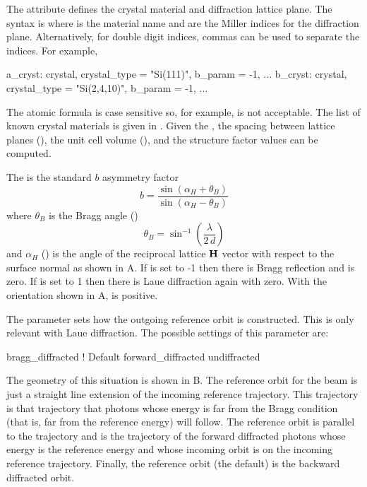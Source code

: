 The  attribute defines the crystal material and diffraction lattice plane. The
syntax is  where  is the material name and  are the Miller indices
for the diffraction plane. Alternatively, for double digit indices, commas can be used to separate
the indices. For example,
\begin{example}
  a_cryst: crystal, crystal_type = "Si(111)", b_param = -1, ...
  b_cryst: crystal, crystal_type = "Si(2,4,10)", b_param = -1, ...
\end{example}
The atomic formula is case sensitive so, for example,  is not acceptable. The list of
known crystal materials is given in . Given the , the spacing
between lattice planes (), the unit cell volume (), and the structure
factor\cite{b:batterman} values can be computed.

The  is the standard $b$ asymmetry factor
\begin{equation}
  b = \frac{\sin(\alpha_H + \theta_B)}{\sin(\alpha_H - \theta_B)} 
  \label{batat}
\end{equation}
where $\theta_B$ is the Bragg angle () 
\begin{equation}
  \theta_B = \sin^{-1} \left( \frac{\lambda}{2 \, d} \right)
  \label{tsl2d}
\end{equation}
and $\alpha_H$ () is the angle of the reciprocal lattice ${\bf H}$ vector with respect
to the surface normal as shown in A.  If  is set to -1 then there is
Bragg reflection and  is zero. If  is set to 1 then there is Laue
diffraction again with  zero. With the orientation shown in A,
 is positive.


The  parameter sets how the outgoing reference orbit is constructed. This is
only relevant with Laue diffraction.  The possible settings of this parameter are:
\begin{example}
  bragg_diffracted      ! Default
  forward_diffracted
  undiffracted
\end{example}
The geometry of this situation is shown in B. The reference orbit for the
 beam is just a straight line extension of the incoming reference trajectory. This
trajectory is that trajectory that photons whose energy is far from the Bragg condition (that is,
far from the reference energy) will follow. The  reference orbit is parallel
to the  trajectory and is the trajectory of the forward diffracted photons whose
energy is the reference energy and whose incoming orbit is on the incoming reference trajectory.
Finally, the  reference orbit (the default) is the backward diffracted orbit.

